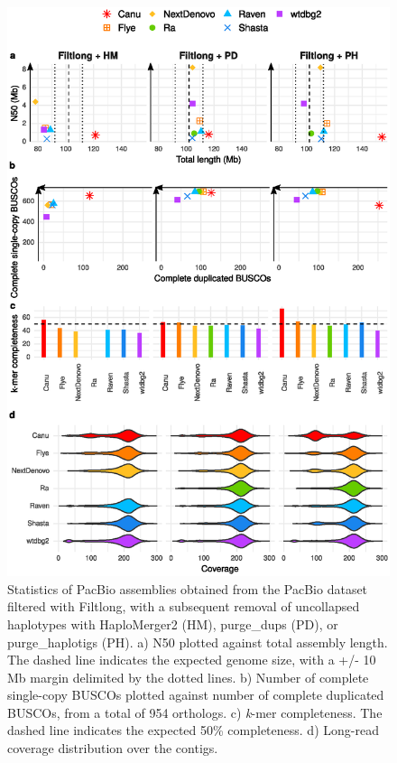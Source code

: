 \begin{suppsection}
     \begin{figure}[ht]
    \centering
     \includegraphics[width=13.5cm]{fig/benchmark/supp_pacbio_filtlong_purging.eps}
   \caption{Statistics of PacBio assemblies obtained from the PacBio dataset filtered with Filtlong, with a subsequent removal of uncollapsed haplotypes with HaploMerger2 (HM), purge\_dups (PD), or purge\_haplotigs (PH). a) N50 plotted against total assembly length. The dashed line indicates the expected genome size, with a +/- 10 Mb margin delimited by the dotted lines. b) Number of complete single-copy BUSCOs plotted against number of complete duplicated BUSCOs, from a total of 954 orthologs. c) \textit{k}-mer completeness. The dashed line indicates the expected 50\% completeness. d) Long-read coverage distribution over the contigs.}
   \label{fig:pacbio_filtlong_purging}
 \end{figure}
 

\end{suppsection}
